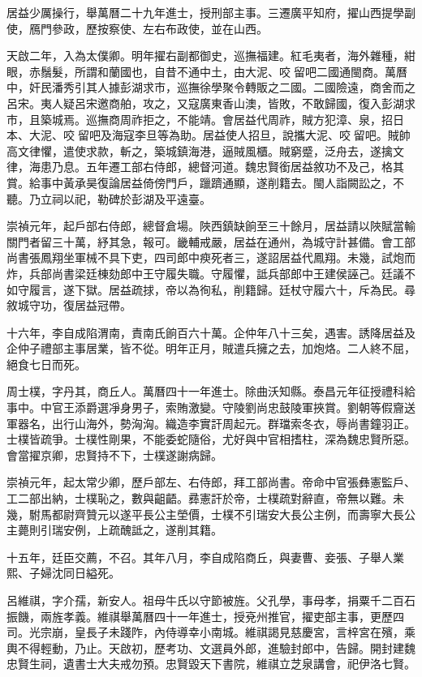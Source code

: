 \begin{pinyinscope}
居益少厲操行，舉萬曆二十九年進士，授刑部主事。三遷廣平知府，擢山西提學副使，鴈門參政，歷按察使、左右布政使，並在山西。

天啟二年，入為太僕卿。明年擢右副都御史，巡撫福建。紅毛夷者，海外雜種，紺眼，赤鬚髮，所謂和蘭國也，自昔不通中土，由大泥、咬留吧二國通閩商。萬曆中，奸民潘秀引其人據彭湖求市，巡撫徐學聚令轉販之二國。二國險遠，商舍而之呂宋。夷人疑呂宋邀商舶，攻之，又寇廣東香山澳，皆敗，不敢歸國，復入彭湖求市，且築城焉。巡撫商周祚拒之，不能靖。會居益代周祚，賊方犯漳、泉，招日本、大泥、咬留吧及海寇李旦等為助。居益使人招旦，說攜大泥、咬留吧。賊帥高文律懼，遣使求款，斬之，築城鎮海港，逼賊風櫃。賊窮蹙，泛舟去，遂擒文律，海患乃息。五年遷工部右侍郎，總督河道。魏忠賢銜居益敘功不及己，格其賞。給事中黃承昊復論居益倚傍門戶，躐躋通顯，遂削籍去。閩人詣闕訟之，不聽。乃立祠以祀，勒碑於彭湖及平遠臺。

崇禎元年，起戶部右侍郎，總督倉場。陜西鎮缺餉至三十餘月，居益請以陜賦當輸關門者留三十萬，紓其急，報可。畿輔戒嚴，居益在通州，為城守計甚備。會工部尚書張鳳翔坐軍械不具下吏，四司郎中瘐死者三，遂詔居益代鳳翔。未幾，試炮而炸，兵部尚書梁廷棟劾郎中王守履失職。守履懼，詆兵部郎中王建侯誣己。廷議不如守履言，遂下獄。居益疏捄，帝以為徇私，削籍歸。廷杖守履六十，斥為民。尋敘城守功，復居益冠帶。

十六年，李自成陷渭南，責南氏餉百六十萬。企仲年八十三矣，遇害。誘降居益及企仲子禮部主事居業，皆不從。明年正月，賊遣兵擁之去，加炮烙。二人終不屈，絕食七日而死。

周士樸，字丹其，商丘人。萬曆四十一年進士。除曲沃知縣。泰昌元年征授禮科給事中。中官王添爵選凈身男子，索賄激變。守陵劉尚忠鼓陵軍挾賞。劉朝等假齎送軍器名，出行山海外，勢洶洶。織造李實訐周起元。群璫索冬衣，辱尚書鐘羽正。士樸皆疏爭。士樸性剛果，不能委蛇隨俗，尤好與中官相搘柱，深為魏忠賢所惡。會當擢京卿，忠賢持不下，士樸遂謝病歸。

崇禎元年，起太常少卿，歷戶部左、右侍郎，拜工部尚書。帝命中官張彝憲監戶、工二部出納，士樸恥之，數與齟齬。彞憲訐於帝，士樸疏對辭直，帝無以難。未幾，駙馬都尉齊贊元以遂平長公主塋價，士樸不引瑞安大長公主例，而壽寧大長公主薨則引瑞安例，上疏醜詆之，遂削其籍。

十五年，廷臣交薦，不召。其年八月，李自成陷商丘，與妻曹、妾張、子舉人業熙、子婦沈同日縊死。

呂維祺，字介孺，新安人。祖母牛氏以守節被旌。父孔學，事母孝，捐粟千二百石振饑，兩旌孝義。維祺舉萬曆四十一年進士，授兗州推官，擢吏部主事，更歷四司。光宗崩，皇長子未踐阼，內侍導幸小南城。維祺謁見慈慶宮，言梓宮在殯，乘輿不得輕動，乃止。天啟初，歷考功、文選員外郎，進驗封郎中，告歸。開封建魏忠賢生祠，遺書士大夫戒勿預。忠賢毀天下書院，維祺立芝泉講會，祀伊洛七賢。


\end{pinyinscope}
